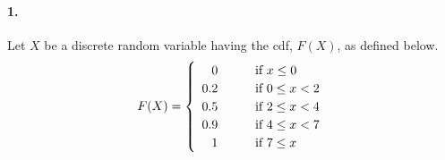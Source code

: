 

\graphicspath{ {./images/} }

\renewcommand\assignment{Homework 5, Due Friday, February 17, 23:59}



    \iffalse
    \begin{equation*}
        \begin{gathered}
            Equations go here.
        \end{gathered}
    \end{equation*}

    \resizebox{\hsize}{!}{$Long equation goes here$}

    \begin{multicol*}{# of columns}
    \end{multicol*}

    \horizontal

    \fi


    \paragraph*{1.}
    Let $X$ be a discrete random variable having the cdf, $F(X)$, as defined below.
    \begin{equation*}
        F(X) = \left\{
            {\def\arraystretch{1.2}
            \begin{array}{rll}
            0   & \quad & \text{if } x \leq 0       \\
            0.2 & \quad & \text{if } 0 \leq x < 2   \\
            0.5 & \quad & \text{if } 2 \leq x < 4   \\
            0.9 & \quad & \text{if } 4 \leq x < 7   \\
            1   & \quad & \text{if } 7 \leq x  
        \end{array}}
        \right.
    \end{equation*}

